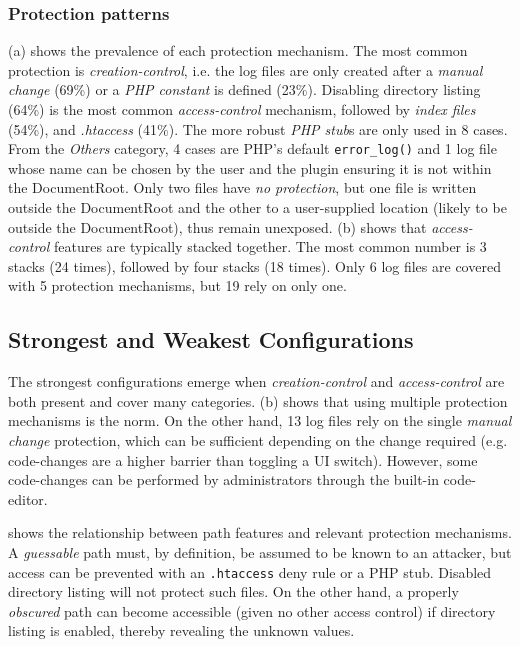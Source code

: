 \documentclass[sigconf]{acmart}
\begin{document}
\subsubsection{Protection patterns}
(a) shows the prevalence of each protection mechanism. 
The most common protection is \emph{creation-control}, i.e. the log files are only created after a \emph{manual change} (69\%) or a \emph{PHP constant} is defined (23\%).
Disabling directory listing (64\%) is the most common \emph{access-control} mechanism, followed by \emph{index files} (54\%), and \emph{.htaccess} (41\%). The more robust \emph{PHP stub}s are only used in 8 cases. 
From the \emph{Others} category, 4 cases are PHP's default \texttt{error\_log()} and 1 log file whose name can be chosen by the user and the plugin ensuring it is not within the DocumentRoot.
Only two files have \emph{no protection}, but one file is written outside the DocumentRoot and the other to a user-supplied location (likely to be outside the DocumentRoot), thus remain unexposed.
(b) shows that \emph{access-control} features are typically stacked together. The most common number is 3 stacks (24 times), followed by four stacks (18 times). Only 6 log files are covered with 5 protection mechanisms, but 19 rely on only one.



\subsection{Strongest and Weakest Configurations}
The strongest configurations emerge when \emph{creation-control} and \emph{access-control} are both present and cover many categories. (b) shows that using multiple protection mechanisms is the norm.
On the other hand, 13 log files rely on the single \emph{manual change} protection, which can be sufficient depending on the change required (e.g. code-changes are a higher barrier than toggling a UI switch). However, some code-changes can be performed by administrators through the built-in code-editor.

 shows the relationship between path features and relevant protection mechanisms. 
A \emph{guessable} path must, by definition, be assumed to be known to an attacker, but access can be prevented with an \texttt{.htaccess} deny rule or a PHP stub. Disabled directory listing will not protect such files. 
On the other hand, a properly \emph{obscured} path can become accessible (given no other access control) if directory listing is enabled, thereby revealing the unknown values.
\end{document}
